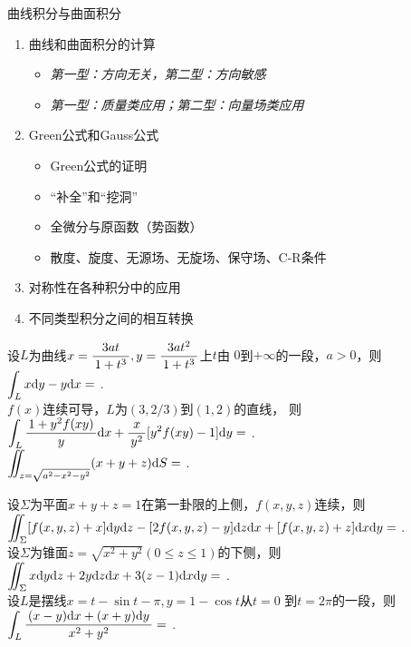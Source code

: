 \begin{frame}{曲线积分与曲面积分}
	\linespread{1.2}
	\begin{enumerate}
	  \item 曲线和曲面积分的计算
	  \begin{itemize}
	    \item {\it 第一型：方向无关，第二型：方向敏感}
	    \item {\it 第一型：质量类应用；第二型：向量场类应用}
	  \end{itemize}
	  \item Green公式和Gauss公式
	  {\it
	  \begin{itemize}
	    \item Green公式的证明
	    \item “补全”和“挖洞”
	    \item 全微分与原函数（势函数）
	    \item 散度、旋度、无源场、无旋场、保守场、C-R条件
	  \end{itemize}
	  }
	  \item 对称性在各种积分中的应用
	  \item 不同类型积分之间的相互转换
	\end{enumerate}
\end{frame}

\begin{frame}
	\linespread{1.5}
	设$L$为曲线$x=\displaystyle\frac{\,{3at}\,}{\,{1+t^3}\,},y=\displaystyle\frac{\,{3at^2}\,}{\,{1+t^3}\,}$上$t$由
	$0$到$+\infty$的一段，$a>0$，则$\displaystyle\int_Lx\mathrm{d} y-y\mathrm{d} x=$
	\underline{\;}.\\[1em]
	
	$f(x)$连续可导，$L$为$(3,2/3)$到$(1,2)$的直线，
	则$\displaystyle\int_L\displaystyle\frac{\,{1+y^2f(xy)}\,}{\,{y}\,}\mathrm{d} x+\displaystyle\frac{\,{x}\,}{\,{y^2}\,}[y^2f(xy)-1]\mathrm{d} y=$
	\underline{\;}.\\[1em]
	
	$\displaystyle\iint_{z=\sqrt{a^2-x^2-y^2}}(x+y+z)\mathrm{d} S=$
	\underline{\;}.\\[1em]
\end{frame}

\begin{frame}
	\linespread{1.5}
	设$\Sigma$为平面$x+y+z=1$在第一卦限的上侧，$f(x,y,z)$连续，则
	$\displaystyle\iint_{\Sigma}[f(x,y,z)+x]\mathrm{d} y\mathrm{d} z-[2f(x,y,z)-y]\mathrm{d} z\mathrm{d} x+
	[f(x,y,z)+z]\mathrm{d} x\mathrm{d} y=$
	\underline{\;}.\\[1em]
	
	设$\Sigma$为锥面$z=\sqrt{x^2+y^2}(0\leq z\leq 1)$的下侧，则
	$\displaystyle\iint_{\Sigma}x\mathrm{d} y\mathrm{d} z+2y\mathrm{d} z\mathrm{d} x+3(z-1)\mathrm{d} x\mathrm{d} y=$
	\underline{\;}.\\[1em]
	
	设$L$是摆线$x=t-\sin t-\pi,y=1-\cos t$从$t=0$
	到$t=2\pi$的一段，则$\displaystyle\int_L\displaystyle\frac{\,{(x-y)\mathrm{d} x+(x+y)\mathrm{d} y}\,}{\,{x^2+y^2}\,}=$
	\underline{\;}.\\[1em]
\end{frame}

